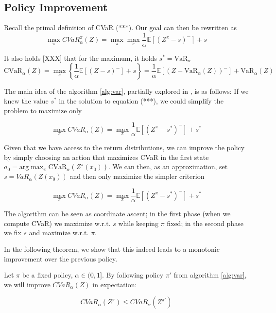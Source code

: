 \subsection{Policy Improvement}
Recall the primal definition of CVaR (***).
Our goal can then be rewritten as
\begin{equation}\label{eq:goal}
\max_\pi CVaR_\alpha^\pi(Z) = \max_\pi \max_s \dfrac{1}{\alpha}\mathbb{E}
\left[ (Z^\pi-s)^-\right] + s
\end{equation}


It also holds [XXX] that for the maximum, it holds $s^*=\text{VaR}_\alpha$
\begin{equation}
\text{CVaR}_\alpha(Z)=
\max_s\left\lbrace \dfrac{1}{\alpha}\mathbb{E}
\left[ (Z-s)^-\right] + s  \right\rbrace =\dfrac{1}{\alpha}\mathbb{E}
\left[ (Z - \text{VaR}_\alpha(Z))^-\right] + \text{VaR}_\alpha(Z) 
\end{equation}


The main idea of the algorithm \ref{alg:var}, partially explored in \cite{bauerle2011markov}, is as follows: If we knew the value $s^*$ in the solution to equation (***), we could simplify the problem to maximize only

\begin{equation}\label{eq:goal}
\max_\pi CVaR_\alpha(Z) = \max_\pi \dfrac{1}{\alpha}\mathbb{E}
\left[ (Z^\pi-s^*)^-\right] + s^*
\end{equation}

Given that we have access to the return distributions, we can improve the policy by simply choosing an action that maximizes CVaR in the first state $a_0 = \text{arg}\max_\pi\text{CVaR}_\alpha(Z^\pi(x_0))$. We can then, as an approximation, set $s= VaR_\alpha(Z(x_0))$ and then only maximize the simpler criterion


\begin{equation}
\max_\pi CVaR_\alpha(Z) = \max_\pi \dfrac{1}{\alpha}\mathbb{E}
\left[ (Z^\pi-s^*)^-\right] + s^*
\end{equation}


The algorithm can be seen as coordinate ascent; in the first phase (when we compute CVaR) we maximize w.r.t. $s$ while keeping $\pi$ fixed; in the second phase we fix $s$ and maximize w.r.t. $\pi$.

In the following theorem, we show that this indeed leads to a monotonic improvement over the previous policy.

\begin{theorem}
Let $\pi$ be a fixed policy, $\alpha \in (0, 1]$. By following policy $\pi'$ from algorithm \ref{alg:var}, we will improve $CVaR_\alpha(Z)$ in expectation:

$$CVaR_\alpha(Z^\pi) \le CVaR_\alpha(Z^{\pi'})$$

\end{theorem}


